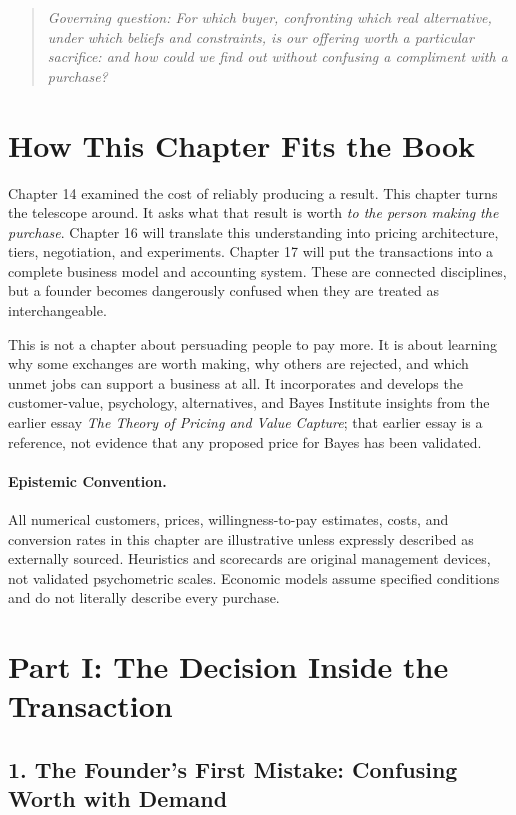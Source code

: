\begin{quote}
\itshape
Governing question: For which buyer, confronting which real alternative, under which beliefs and constraints, is our offering worth a particular sacrifice: and how could we find out without confusing a compliment with a purchase?
\end{quote}

\section*{How This Chapter Fits the Book}

Chapter 14 examined the cost of reliably producing a result. This chapter turns the telescope around. It asks what that result is worth \emph{to the person making the purchase}. Chapter 16 will translate this understanding into pricing architecture, tiers, negotiation, and experiments. Chapter 17 will put the transactions into a complete business model and accounting system. These are connected disciplines, but a founder becomes dangerously confused when they are treated as interchangeable.

This is not a chapter about persuading people to pay more. It is about learning why some exchanges are worth making, why others are rejected, and which unmet jobs can support a business at all. It incorporates and develops the customer-value, psychology, alternatives, and Bayes Institute insights from the earlier essay \emph{The Theory of Pricing and Value Capture}; that earlier essay is a reference, not evidence that any proposed price for Bayes has been validated.

\paragraph*{Epistemic Convention.} All numerical customers, prices, willingness-to-pay estimates, costs, and conversion rates in this chapter are illustrative unless expressly described as externally sourced. Heuristics and scorecards are original management devices, not validated psychometric scales. Economic models assume specified conditions and do not literally describe every purchase.

\section*{Part I: The Decision Inside the Transaction}

\subsection*{1. The Founder's First Mistake: Confusing Worth with Demand}

